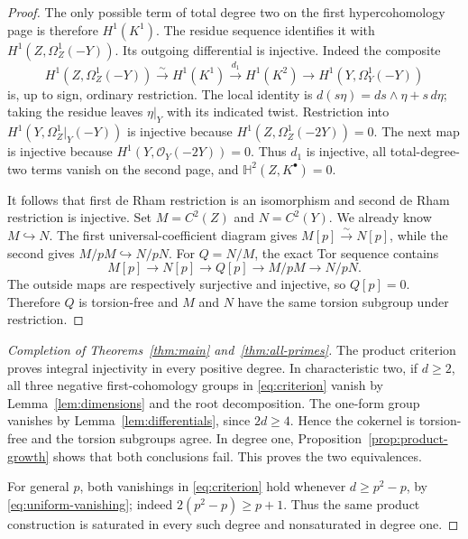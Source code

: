 \documentclass[11pt,a4paper]{article}
\newcommand{\OO}{\mathcal O}
\newcommand{\HH}{\mathbb H}
\theoremstyle{definition}\newtheorem{definition}[theorem]{Definition}
\theoremstyle{remark}\newtheorem{remark}[theorem]{Remark}
\numberwithin{equation}{section}
\begin{document}
\begin{proof}
The only possible term of total degree two on the first hypercohomology page is therefore $H^1(K^1)$. The residue sequence identifies it with $H^1(Z,\Omega_Z^1(-Y))$. Its outgoing differential is injective. Indeed the composite
\[
 H^1(Z,\Omega_Z^1(-Y))\xrightarrow{\sim}H^1(K^1)
 \xrightarrow{d_1}H^1(K^2)\longrightarrow H^1(Y,\Omega_Y^1(-Y))
\]
is, up to sign, ordinary restriction. The local identity is
$d(s\eta)=ds\wedge\eta+s\,d\eta$; taking the residue leaves $\eta|_Y$ with its indicated twist. Restriction into $H^1(Y,\Omega_Z^1|_Y(-Y))$ is injective because $H^1(Z,\Omega_Z^1(-2Y))=0$. The next map is injective because $H^1(Y,\OO_Y(-2Y))=0$. Thus $d_1$ is injective, all total-degree-two terms vanish on the second page, and $\HH^2(Z,K^\bullet)=0$.

It follows that first de Rham restriction is an isomorphism and second de Rham restriction is injective. Set $M=C^2(Z)$ and $N=C^2(Y)$. We already know $M\hookrightarrow N$. The first universal-coefficient diagram gives $M[p]\xrightarrow{\sim}N[p]$, while the second gives $M/pM\hookrightarrow N/pN$. For $Q=N/M$, the exact Tor sequence contains
\[
 M[p]\longrightarrow N[p]\longrightarrow Q[p]
             \longrightarrow M/pM\longrightarrow N/pN.
\]
The outside maps are respectively surjective and injective, so $Q[p]=0$. Therefore $Q$ is torsion-free and $M$ and $N$ have the same torsion subgroup under restriction.
\end{proof}

\begin{proof}[Completion of Theorems~\ref{thm:main} and~\ref{thm:all-primes}]
The product criterion proves integral injectivity in every positive degree. In characteristic two, if $d\ge2$, all three negative first-cohomology groups in \eqref{eq:criterion} vanish by Lemma~\ref{lem:dimensions} and the root decomposition. The one-form group vanishes by Lemma~\ref{lem:differentials}, since $2d\ge4$. Hence the cokernel is torsion-free and the torsion subgroups agree. In degree one, Proposition~\ref{prop:product-growth} shows that both conclusions fail. This proves the two equivalences.

For general $p$, both vanishings in \eqref{eq:criterion} hold whenever $d\ge p^2-p$, by \eqref{eq:uniform-vanishing}; indeed $2(p^2-p)\ge p+1$. Thus the same product construction is saturated in every such degree and nonsaturated in degree one.
\end{proof}




\end{document}
